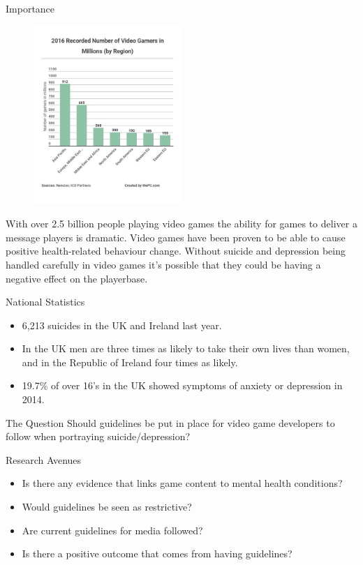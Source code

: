 \documentclass{beamer}
\begin{document}
\begin{frame}{Importance}
	\begin{figure} %
		\centering
		\includegraphics[width=0.5\textwidth]{numberOfGamers}
	\end{figure}
	With over 2.5 billion people playing video games the ability for games to deliver a message players is dramatic. Video games have been proven to be able to cause positive health-related behaviour change\cite{baranowski2008playing}. Without suicide and depression being handled carefully in video games it's possible that they could be having a negative effect on the playerbase.
\end{frame}

\begin{frame}{National Statistics}
		\begin{itemize}
		\item 6,213 suicides in the UK and Ireland last year\cite{death2018suicide}.
		\item In the UK men are three times as likely to take their own lives than women, and in the Republic of Ireland four times as likely\cite{death2018suicide}.
		\item 19.7\% of over 16's in the UK showed symptoms of anxiety or depression in 2014\cite{MentalStatistics}.
	\end{itemize}
\end{frame}

\begin{frame}{The Question}
	Should guidelines be put in place for video game developers to follow when portraying suicide/depression?
\end{frame}

\begin{frame}{Research Avenues}
	\begin{itemize}
		\item Is there any evidence that links game content to mental health conditions?
		\item Would guidelines be seen as restrictive?
		\item Are current guidelines for media followed?
		\item Is there a positive outcome that comes from having guidelines?
	\end{itemize}
\end{frame}
\end{document}
